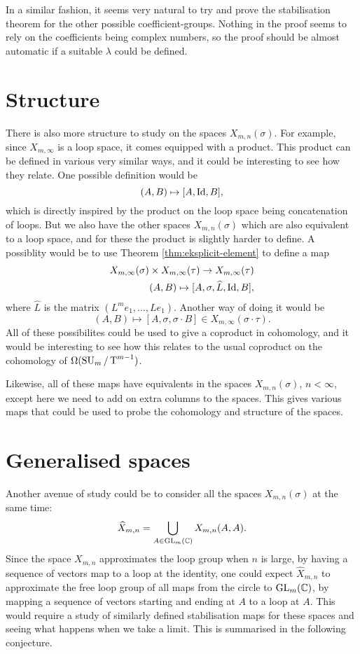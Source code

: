 In a similar fashion, it seems very natural to try and prove the
stabilisation theorem for the other possible
coefficient-groups. Nothing in the proof seems to rely on the
coefficients being complex numbers, so the proof should be almost
automatic if a suitable $\lambda$ could be defined.

\section{Structure}

There is also more structure to study on the spaces
$X_{m,n}(\sigma)$. For example, since $X_{m,\infty}$ is a
loop space, it comes equipped with a product. This product can be
defined in various very similar ways, and it could be interesting to
see how they relate. One possible definition would be
\[ (A,B) \mapsto [A,\operatorname{Id}, B], \]
which is directly inspired by the product on the loop space being
concatenation of loops. But we also have the other spaces
$X_{m,n}(\sigma)$ which are also equivalent to a loop space, and for
these the product is slightly harder to define. A possiblity would be
to use Theorem \ref{thm:eksplicit-element} to define a map
\begin{align*}
  X_{m,\infty}(\sigma) \times X_{m,\infty}(\tau) \to
  X_{m,\infty}(\tau) \\
  (A,B) \mapsto [A,\sigma,\widehat{L},\operatorname{Id},B],
\end{align*}
where $\widehat{L}$ is the matrix $(L^m e_1,\dots,Le_1)$. Another way
of doing it would be
\[ (A,B) \mapsto [A,\sigma,\sigma\cdot B] \in
X_{m,\infty}(\sigma\cdot\tau). \]
All of these possibilites could be used to give a coproduct in
cohomology, and it would be interesting to see how this relates to the
usual coproduct on the cohomology of $\Omega(\operatorname{SU}_{m}/\operatorname{T}^{m-1})$.

Likewise, all of these maps have equivalents in the spaces
$X_{m,n}(\sigma)$, $n < \infty$, except here we
need to add on extra columns to the spaces. This gives various maps
that could be used to probe the cohomology and structure of the
spaces.

\section{Generalised spaces}

Another avenue of study could be to consider all the spaces
$X_{m,n}(\sigma)$ at the same time:
\[ \widehat{X}_{m,n} = \bigcup_{A \in \operatorname{GL}_m(\mathbb{C})} X_{m,n}(A,A). \]
Since the space $X_{m,n}$ approximates the loop group when $n$ is
large, by having a sequence of vectors map to a loop at the identity,
one could expect $\widehat{X}_{m,n}$ to approximate the free loop
group of all maps from the circle to $\operatorname{GL}_m(\mathbb{C})$, by mapping a
sequence of vectors starting and ending at $A$ to a loop at $A$. This
would require a study of similarly defined stabilisation maps for
these spaces and seeing what happens when we take a limit. This
is summarised in the following conjecture.

